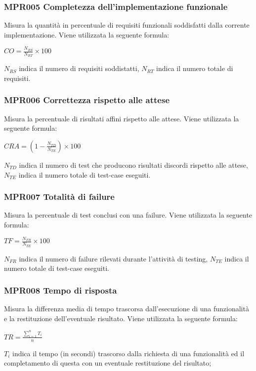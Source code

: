 \subsubsection{MPR005 Completezza dell'implementazione funzionale}
Misura la quantità in percentuale di requisiti funzionali soddisfatti dalla corrente implementazione. Viene utilizzata la seguente formula: 
\begin{center}{$CO=\frac{N_{RS}}{N_{RT}}\times 100$}\end{center}
$N_{RS}$  indica il numero di requisiti soddistatti, $N_{RT}$  indica il numero totale di requisiti.

\subsubsection{MPR006 Correttezza  rispetto alle attese}
Misura la percentuale di risultati affini rispetto alle attese. Viene utilizzata la seguente formula:
\begin{center}{$CRA=(1-\frac{N_{TD}}{N_{TE}})\times 100$}\end{center}
${N_{TD}}$ indica il numero di test che producono risultati discordi rispetto alle attese, ${N_{TE}}$ indica il numero totale di test-case eseguiti.

\subsubsection{MPR007 Totalità di failure}
Misura la percentuale di test conclusi con una failure. Viene utilizzata la seguente formula:
\begin{center}{$TF=\frac{N_{FR}}{N_{TE}}\times 100$}\end{center}
${N_{FR}}$ indica il numero di failure rilevati durante l'attività di testing,
${N_{TE}}$ indica il numero totale di test-case eseguiti.

\subsubsection{MPR008 Tempo di risposta}
Misura la differenza media di tempo trascorsa dall’esecuzione di una funzionalità e la restituzione
dell’eventuale risultato. Viene utilizzata la seguente formula:
\begin{center}{$TR=\frac{\sum\limits_{i=1}^n {T_i }}{n}$}\end{center}
${T_i}$ indica il tempo (in secondi) trascorso dalla richiesta di una funzionalità ed il completamento di questa con un eventuale restituzione del risultato;\\

